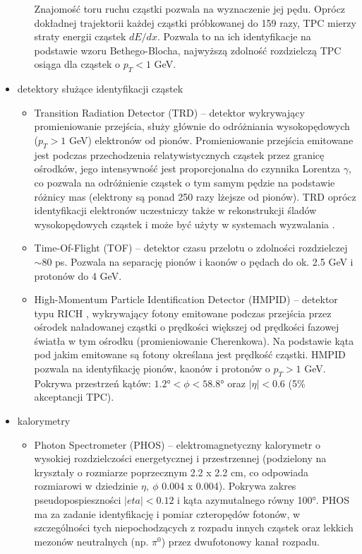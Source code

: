 \begin{itemize}
\begin{itemize}
		Znajomość toru ruchu cząstki pozwala na wyznaczenie jej pędu. Oprócz dokładnej trajektorii każdej cząstki próbkowanej do 159 razy, TPC mierzy straty energii cząstek $dE/dx$. Pozwala to na ich identyfikacje na podstawie wzoru Bethego-Blocha, najwyższą zdolność rozdzielczą TPC osiąga dla cząstek o $p_T < 1$ GeV.
	\end{itemize}
	\item detektory służące identyfikacji cząstek 
	\begin{itemize}
		\item Transition Radiation Detector (TRD) -- detektor wykrywający promieniowanie przejścia, służy głównie do odróżniania wysokopędowych ($p_T > 1$ GeV) elektronów od pionów. Promieniowanie przejścia emitowane jest podczas przechodzenia relatywistycznych cząstek przez granicę ośrodków, jego intensywność jest proporcjonalna do czynnika Lorentza $\gamma$, co pozwala na odróżnienie cząstek o tym samym pędzie na podstawie różnicy mas (elektrony są ponad 250 razy lżejsze od pionów). TRD oprócz identyfikacji elektronów uczestniczy także w rekonstrukcji śladów wysokopędowych cząstek i może być użyty w systemach wyzwalania .
		\item Time-Of-Flight (TOF) -- detektor czasu przelotu o zdolności rozdzielczej $\sim80$ ps. Pozwala na separację pionów i kaonów o pędach do ok. 2.5 GeV i protonów do 4 GeV.  
		\item High-Momentum Particle Identification Detector (HMPID) -- detektor typu RICH , wykrywający fotony emitowane podczas przejścia przez ośrodek naładowanej cząstki o prędkości większej od prędkości fazowej światła w tym ośrodku (promieniowanie Cherenkowa). Na podstawie kąta pod jakim emitowane są fotony określana jest prędkość cząstki. HMPID pozwala na identyfikację pionów, kaonów i protonów o $p_T > 1$ GeV. Pokrywa przestrzeń kątów: $\ang{1.2} < \phi < \ang{58.8}$ oraz $|\eta| < 0.6$ (5\% akceptancji TPC).
	\end{itemize}
	\item kalorymetry
	\begin{itemize}
		\item Photon Spectrometer (PHOS) -- elektromagnetyczny kalorymetr o wysokiej rozdzielczości energetycznej i przestrzennej (podzielony na kryształy o rozmiarze poprzecznym 2.2 x 2.2 cm, co odpowiada rozmiarowi w dziedzinie $\eta,~\phi$ 0.004 x 0.004). Pokrywa zakres pseudopospieszności $|eta| < 0.12$ i kąta azymutalnego równy \ang{100}. PHOS ma za zadanie identyfikację i pomiar czteropędów fotonów, w szczególności tych niepochodzących z rozpadu innych cząstek  oraz lekkich mezonów neutralnych (np. $\pi^0$) przez dwufotonowy kanał rozpadu.

\end{itemize}
\end{itemize}
